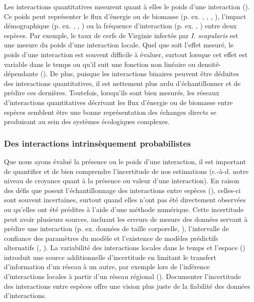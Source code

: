 Les interactions quantitatives mesurent quant à elles le poids d'une interaction
(\cite{Berlow2004Interaction}). Ce poids peut représenter le flux d'énergie ou
de biomasse (p. ex. \cite{Benke2001Food}, \cite{Post2002Long},
\cite{Bersier2002Quantitative}, \cite{Borrett2019Walk}), l'impact démographique
(p. ex. \cite{Paine1992Foodweb}, \cite{Kokkoris2002Variability},
\cite{Emmerson2004Predatorprey}) ou la fréquence d'interaction (p. ex.
\cite{Herrera1989Pollinator}, \cite{Montoya2003Food}) entre deux espèces. Par
exemple, le taux de cerfs de Virginie infectés par \textit{I. scapularis} est
une mesure du poids d'une interaction locale. Quel que soit l'effet mesuré, le
poids d'une interaction est souvent difficile à évaluer, surtout lorsque cet
effet est variable dans le temps ou qu'il suit une fonction non linéaire ou
densité-dépendante (\cite{Wootton2005Measurement}). De plus, puisque les
interactions binaires peuvent être déduites des interactions quantitatives, il
est nettement plus ardu d'échantillonner et de prédire ces dernières. Toutefois,
lorsqu'ils sont bien mesurés, les réseaux d'interactions quantitatives décrivant
les flux d'énergie ou de biomasse entre espèces semblent être une bonne
représentation des échanges directs se produisant au sein des systèmes
écologiques complexes. 

\subsubsection{Des interactions intrinsèquement probabilistes} 

Que nous ayons évalué la présence ou le poids d'une interaction, il est
important de quantifier et de bien comprendre l'incertitude de nos estimations
(c.-à-d. notre niveau de croyance quant à la présence ou valeur d'une
interaction). En raison des défis que posent l'échantillonnage des interactions
entre espèces (\cite{Jordano2016Sampling}), celles-ci sont souvent incertaines,
surtout quand elles n'ont pas été directement observées ou qu'elles ont été
prédites à l'aide d'une méthode numérique. Cette incertitude peut avoir
plusieurs sources, incluant les erreurs de mesure des données servant à prédire
une interaction (p. ex. données de taille corporelle,
\cite{Gravel2013Inferring}), l'intervalle de confiance des paramètres du modèle
et l'existence de modèles prédictifs alternatifs (\cite{Simmonds2022Insights},
\cite{Simmonds2024Recommendations}). La variabilité des interactions locales
dans le temps et l'espace (\cite{Poisot2015Species}) introduit une source
additionnelle d'incertitude en limitant le transfert d'information d'un réseau à
un autre, par exemple lors de l'inférence d'interactions locales à partir d'un
réseau régional (\cite{Dansereau2023Spatially}). Documenter l'incertitude des
interactions entre espèces offre une vision plus juste de la fiabilité des
données d'interactions. 


